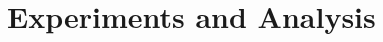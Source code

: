\documentclass{article}
\begin{document}


\section{Experiments and Analysis}
\label{sec:experiments}
\end{document}
